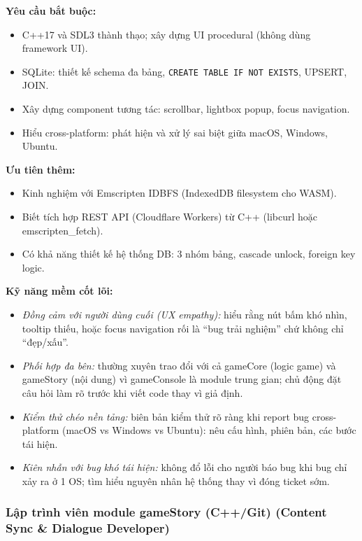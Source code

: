 \documentclass[12pt,a4paper]{article}
\begin{document}
\noindent\textbf{Yêu cầu bắt buộc:}
\begin{itemize}[nosep]
    \item C++17 và SDL3 thành thạo; xây dựng UI procedural (không dùng framework UI).
    \item SQLite: thiết kế schema đa bảng, \texttt{CREATE TABLE IF NOT EXISTS}, UPSERT, JOIN.
    \item Xây dựng component tương tác: scrollbar, lightbox popup, focus navigation.
    \item Hiểu cross-platform: phát hiện và xử lý sai biệt giữa macOS, Windows, Ubuntu.
\end{itemize}

\noindent\textbf{Ưu tiên thêm:}
\begin{itemize}[nosep]
    \item Kinh nghiệm với Emscripten IDBFS (IndexedDB filesystem cho WASM).
    \item Biết tích hợp REST API (Cloudflare Workers) từ C++ (libcurl hoặc emscripten\_fetch).
    \item Có khả năng thiết kế hệ thống DB: 3 nhóm bảng, cascade unlock, foreign key logic.
\end{itemize}

\noindent\textbf{Kỹ năng mềm cốt lõi:}
\begin{itemize}[nosep]
    \item \textit{Đồng cảm với người dùng cuối (UX empathy):} hiểu rằng nút bấm khó nhìn,
          tooltip thiếu, hoặc focus navigation rối là ``bug trải nghiệm'' chứ không chỉ
          ``đẹp/xấu''.
    \item \textit{Phối hợp đa bên:} thường xuyên trao đổi với cả gameCore (logic game) và
          gameStory (nội dung) vì gameConsole là module trung gian; chủ động đặt câu hỏi
          làm rõ trước khi viết code thay vì giả định.
    \item \textit{Kiểm thử chéo nền tảng:} biên bản kiểm thử rõ ràng khi report bug
          cross-platform (macOS vs Windows vs Ubuntu): nêu cấu hình, phiên bản, các bước
          tái hiện.
    \item \textit{Kiên nhẫn với bug khó tái hiện:} không đổ lỗi cho người báo bug khi
          bug chỉ xảy ra ở 1 OS; tìm hiểu nguyên nhân hệ thống thay vì đóng ticket sớm.
\end{itemize}

\subsubsection{Lập trình viên module gameStory (C++/Git) (Content Sync \& Dialogue Developer)}
\end{document}
